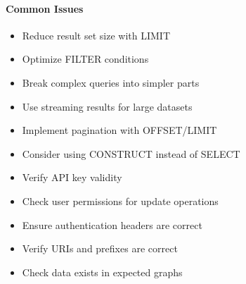 \documentclass[letterpaper,10pt,english]{sphinxmanual}
\begin{document}
\paragraph{Common Issues}
\label{\detokenize{api/sparql-api:common-issues}}\begin{description}
\begin{itemize}
\item {} 
\sphinxAtStartPar
Reduce result set size with LIMIT

\item {} 
\sphinxAtStartPar
Optimize FILTER conditions

\item {} 
\sphinxAtStartPar
Break complex queries into simpler parts

\end{itemize}

\begin{itemize}
\item {} 
\sphinxAtStartPar
Use streaming results for large datasets

\item {} 
\sphinxAtStartPar
Implement pagination with OFFSET/LIMIT

\item {} 
\sphinxAtStartPar
Consider using CONSTRUCT instead of SELECT

\end{itemize}

\begin{itemize}
\item {} 
\sphinxAtStartPar
Verify API key validity

\item {} 
\sphinxAtStartPar
Check user permissions for update operations

\item {} 
\sphinxAtStartPar
Ensure authentication headers are correct

\end{itemize}

\begin{itemize}
\item {} 
\sphinxAtStartPar
Verify URIs and prefixes are correct

\item {} 
\sphinxAtStartPar
Check data exists in expected graphs


\end{itemize}
\end{description}
\end{document}
